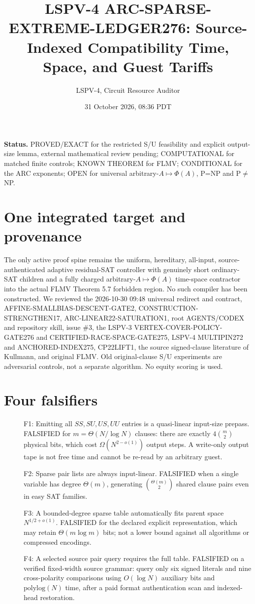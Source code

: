 \documentclass[11pt]{article}
\title{LSPV-4 ARC-SPARSE-EXTREME-LEDGER276: Source-Indexed Compatibility Time, Space, and Guest Tariffs}
\author{LSPV-4, Circuit Resource Auditor}
\date{31 October 2026, 08:36 PDT}
\begin{document}
\maketitle
\noindent\textbf{Status.} PROVED/EXACT for the restricted S/U feasibility and explicit output-size lemma, external mathematical review pending; COMPUTATIONAL for matched finite controls; KNOWN THEOREM for FLMV; CONDITIONAL for the ARC exponents; OPEN for universal arbitrary-$A\mapsto\Phi(A)$, P=NP and P$\ne$NP.

\section*{One integrated target and provenance}
The only active proof spine remains the uniform, hereditary, all-input, source-authenticated adaptive residual-SAT controller with genuinely short ordinary-SAT children and a fully charged arbitrary-$A\mapsto\Phi(A)$ time-space contractor into the actual FLMV Theorem 5.7 forbidden region. No such compiler has been constructed. We reviewed the 2026-10-30 09:48 universal redirect and contract, AFFINE-SMALLBIAS-DESCENT-GATE2, CONSTRUCTION-STRENGTHEN17, ARC-LINEAR22-SATURATION1, root AGENTS/CODEX and repository skill, issue \#3, the LSPV-3 VERTEX-COVER-POLICY-GATE276 and CERTIFIED-RACE-SPACE-GATE275, LSPV-4 MULTIPIN272 and ANCHORED-INDEX275, CP22LIFT1, the source signed-clause literature of Kullmann, and original FLMV. Old original-clause S/U experiments are adversarial controls, not a separate algorithm. No equity scoring is used.

\section*{Four falsifiers}
\begin{description}
\item[] F1: Emitting all $SS,SU,US,UU$ entries is a quasi-linear input-size prepass. FALSIFIED for $m=\Theta(N/\log N)$ clauses: there are exactly $4\binom m2$ physical bits, which cost $\Omega(N^{2-o(1)})$ output steps. A write-only output tape is not free time and cannot be re-read by an arbitrary guest.
\item[] F2: Sparse pair lists are always input-linear. FALSIFIED when a single variable has degree $\Theta(m)$, generating $\binom{\Theta(m)}2$ shared clause pairs even in easy SAT families.
\item[] F3: A bounded-degree sparse table automatically fits parent space $N^{1/2+o(1)}$. FALSIFIED for the declared explicit representation, which may retain $\Theta(m\log m)$ bits; not a lower bound against all algorithms or compressed encodings.
\item[] F4: A selected source pair query requires the full table. FALSIFIED on a verified fixed-width source grammar: query only six signed literals and nine cross-polarity comparisons using $O(\log N)$ auxiliary bits and $\mathrm{polylog}(N)$ time, after a paid format authentication scan and indexed-head restoration.
\end{description}
\end{document}
